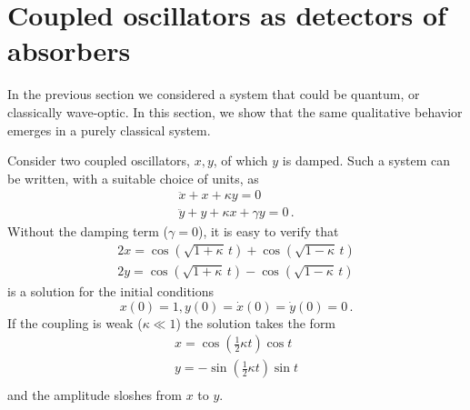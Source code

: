 \documentclass[prb,preprint]{revtex4-1}
\begin{document}
\section{Coupled oscillators as detectors of absorbers}\label{sec:oscill}

In the previous section we considered a system that could be quantum,
or classically wave-optic.  In this section, we show that the same
qualitative behavior emerges in a purely classical system.

Consider two coupled oscillators, $x,y$, of which $y$ is damped.  Such
a system can be written, with a suitable choice of units, as
\begin{equation}
\begin{array}{l}
\ddot x + x + \kappa y = 0 \\
\ddot y + y + \kappa x + \gamma y = 0 \,.
\label{eqn:coupled}
\end{array}
\end{equation}
Without the damping term ($\gamma=0$), it is easy to verify that
\begin{equation}
\begin{array}{l}
2x = \cos(\sqrt{1+\kappa}\,t) + \cos(\sqrt{1-\kappa}\,t)  \\
2y = \cos(\sqrt{1+\kappa}\,t) - \cos(\sqrt{1-\kappa}\,t)
\end{array}
\end{equation}
is a solution for the initial conditions
\begin{equation}
x(0) = 1, y(0) = \dot x(0) = \dot y(0) = 0 \,.
\label{eqn:inic}
\end{equation}
If the coupling is weak ($\kappa\ll1$) the solution takes the form
\begin{equation}
\begin{array}{l}
x = \cos\left(\frac12\kappa t\right) \cos t \\
y = -\sin\left(\frac12\kappa t\right) \sin t \\
\end{array}
\end{equation}
and the amplitude sloshes from $x$ to $y$.
\end{document}
